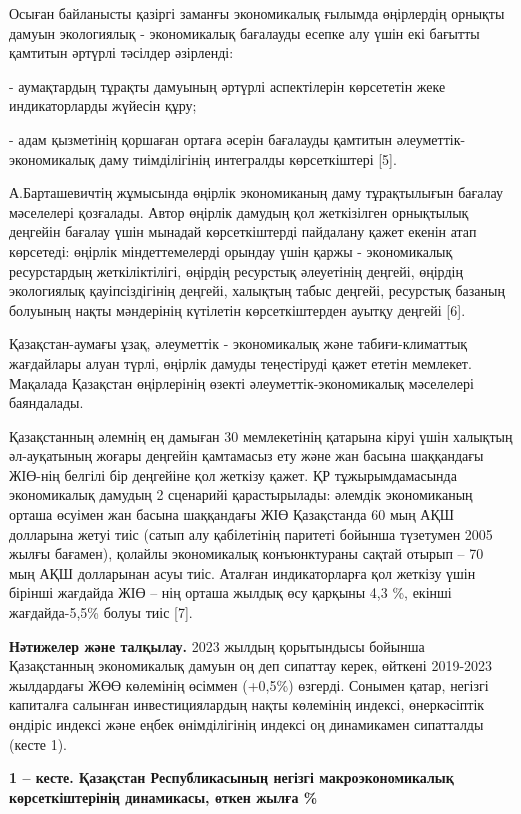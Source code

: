 \begin{multicols}{2}
Осыған байланысты қазіргі заманғы экономикалық ғылымда өңірлердің
орнықты дамуын экологиялық - экономикалық бағалауды есепке алу үшін екі
бағытты қамтитын әртүрлі тәсілдер әзірленді:

- аумақтардың тұрақты дамуының әртүрлі аспектілерін көрсететін жеке
индикаторларды жүйесін құру;

- адам қызметінің қоршаған ортаға әсерін бағалауды қамтитын
әлеуметтік-экономикалық даму тиімділігінің интегралды көрсеткіштері
{[}5{]}.

А.Барташевичтің жұмысында өңірлік экономиканың даму тұрақтылығын бағалау
мәселелері қозғалады. Автор өңірлік дамудың қол жеткізілген орнықтылық
деңгейін бағалау үшін мынадай көрсеткіштерді пайдалану қажет екенін атап
көрсетеді: өңірлік міндеттемелерді орындау үшін қаржы - экономикалық
ресурстардың жеткіліктілігі, өңірдің ресурстық әлеуетінің деңгейі,
өңірдің экологиялық қауіпсіздігінің деңгейі, халықтың табыс деңгейі,
ресурстық базаның болуының нақты мәндерінің күтілетін көрсеткіштерден
ауытқу деңгейі {[}6{]}.

Қазақстан-аумағы ұзақ, әлеуметтік - экономикалық және табиғи-климаттық
жағдайлары алуан түрлі, өңірлік дамуды теңестіруді қажет ететін
мемлекет. Мақалада Қазақстан өңірлерінің өзекті әлеуметтік-экономикалық
мәселелері баяндалады.

Қазақстанның әлемнің ең дамыған 30 мемлекетінің қатарына кіруі үшін
халықтың әл-ауқатының жоғары деңгейін қамтамасыз ету және жан басына
шаққандағы ЖІӨ-нің белгілі бір деңгейіне қол жеткізу қажет. ҚР
тұжырымдамасында экономикалық дамудың 2 сценарийі қарастырылады: әлемдік
экономиканың орташа өсуімен жан басына шаққандағы ЖІӨ Қазақстанда 60 мың
АҚШ долларына жетуі тиіс (сатып алу қабілетінің паритеті бойынша
түзетумен 2005 жылғы бағамен), қолайлы экономикалық конъюнктураны сақтай
отырып -- 70 мың АҚШ долларынан асуы тиіс. Аталған индикаторларға қол
жеткізу үшін бірінші жағдайда ЖІӨ -- нің орташа жылдық өсу қарқыны 4,3
\%, екінші жағдайда-5,5\% болуы тиіс {[}7{]}.

{\bfseries Нәтижелер және талқылау.} 2023 жылдың қорытындысы бойынша
Қазақстанның экономикалық дамуын оң деп сипаттау керек, өйткені
2019-2023 жылдардағы ЖӨӨ көлемінің өсіммен (+0,5\%) өзгерді. Сонымен
қатар, негізгі капиталға салынған инвестициялардың нақты көлемінің
индексі, өнеркәсіптік өндіріс индексі және еңбек өнімділігінің индексі
оң динамикамен сипатталды (кесте 1).
\end{multicols}

{\bfseries 1 -- кесте. Қазақстан Республикасының негізгі макроэкономикалық
көрсеткіштерінің динамикасы, өткен жылға \%}

